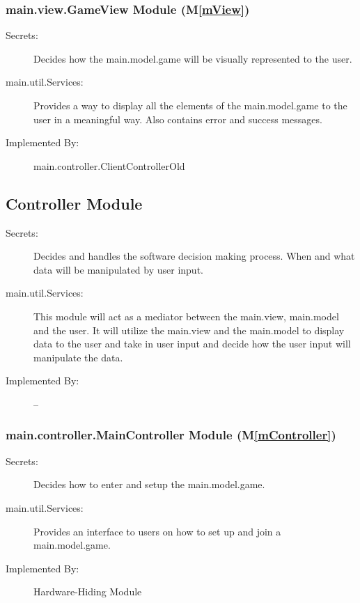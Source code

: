 \documentclass[12pt, titlepage]{article}
\newcommand{\mref}[1]{M\ref{#1}}
\begin{document}
\subsubsection{ main.view.GameView Module (\mref{mView})}
    \begin{description}
    \item[Secrets:] Decides how the main.model.game will be visually represented to the user.
    \item[main.util.Services:] Provides a way to display all the elements of the main.model.game to the user in a meaningful way. Also contains error and success messages.
    \item[Implemented By:] main.controller.ClientControllerOld
    \end{description}


\subsection{Controller Module}

\begin{description}
\item[Secrets:] Decides and handles the software decision making process. When and what data will be manipulated by user input.
\item[main.util.Services:] This module will act as a mediator between the main.view, main.model and the user. It will utilize the main.view and the main.model to display data to the user and take in user input and decide how the user input will manipulate the data.
\item[Implemented By:] --
\end{description}

\subsubsection{ main.controller.MainController Module (\mref{mController})}
    \begin{description}
    \item[Secrets:] Decides how to enter and setup the main.model.game.
    \item[main.util.Services:] Provides an interface to users on how to set up and join a main.model.game.
    \item[Implemented By:] Hardware-Hiding Module
    \end{description}
\end{document}

